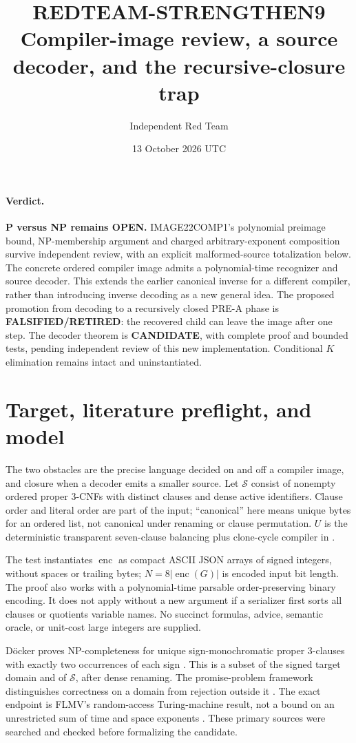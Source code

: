 \documentclass[11pt]{article}
\title{REDTEAM-STRENGTHEN9\\\large Compiler-image review, a source decoder, and the recursive-closure trap}
\author{Independent Red Team}
\date{13 October 2026 UTC}
\newcommand{\enc}{\operatorname{enc}}
\begin{document}
\maketitle

\paragraph{Verdict.}
\textbf{P versus NP remains OPEN.} IMAGE22COMP1's polynomial preimage bound,
NP-membership argument and charged arbitrary-exponent composition survive
independent review, with an explicit malformed-source totalization below.
The concrete ordered compiler image admits a polynomial-time recognizer and
source decoder. This extends the earlier canonical inverse for a different
compiler, rather than introducing inverse decoding as a new general idea.
The proposed promotion from decoding to a recursively closed PRE-A phase is
\textbf{FALSIFIED/RETIRED}: the recovered child can leave the image after one
step. The decoder theorem is \textbf{CANDIDATE}, with complete proof and
bounded tests, pending independent review of this new implementation.
Conditional $K$ elimination remains intact and uninstantiated.

\section{Target, literature preflight, and model}
The two obstacles are the precise language decided on and off a compiler
image, and closure when a decoder emits a smaller source. Let $\mathcal S$
consist of nonempty ordered proper 3-CNFs with distinct clauses and dense
active identifiers. Clause order and literal order are part of the input;
``canonical'' here means unique bytes for an ordered list, not canonical
under renaming or clause permutation. $U$ is the deterministic transparent
seven-clause balancing plus clone-cycle compiler in
.

The test instantiates $\enc$ as compact ASCII JSON arrays of signed integers,
without spaces or trailing bytes; $N=8|\enc(G)|$ is encoded input bit length.
The proof also works with a polynomial-time parsable order-preserving binary
encoding. It does not apply without a new argument if a serializer first
sorts all clauses or quotients variable names. No succinct formulas, advice,
semantic oracle, or unit-cost large integers are supplied.

D\"ocker proves NP-completeness for unique sign-monochromatic proper
3-clauses with exactly two occurrences of each sign \cite{docker}. This is
a subset of the signed target domain and of $\mathcal S$, after dense
renaming. The promise-problem framework distinguishes correctness on a
domain from rejection outside it \cite{esy}. The exact endpoint is FLMV's
random-access Turing-machine result, not a bound on an unrestricted sum of
time and space exponents \cite{flmv}. These primary sources were searched
and checked before formalizing the candidate.
\end{document}
